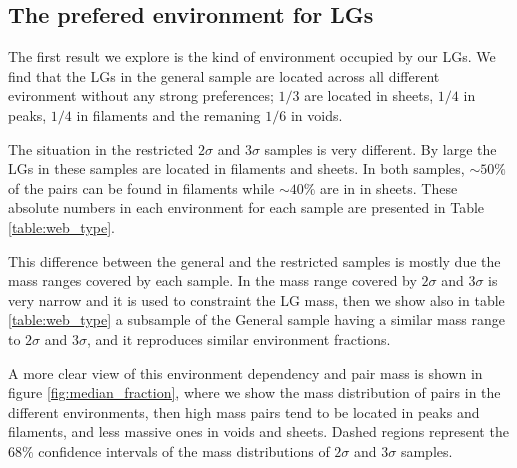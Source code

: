 \documentclass{emulateapj}
\begin{document}




\subsection{The prefered environment for LGs}

The first result we explore is the kind of environment occupied by
our LGs. We find that the LGs in the general sample are located across
all different evironment without any strong preferences; $1/3$  are
located in sheets, $1/4$ in peaks, $1/4$ in filaments and the remaning
$1/6$ in voids. 

The situation in the restricted $2\sigma$ and $3\sigma$ samples is very
different. By large the LGs in these samples are located in
filaments and sheets. In both samples, $\sim 50\%$ of the
pairs can be found in filaments while $\sim 40\%$ are in
in sheets. These absolute numbers in each environment for each sample
are presented in Table \ref{table:web_type}. 

This difference between the general and the restricted samples is mostly due 
the mass ranges covered by each sample. 
In \citet{lganalogues} the mass range covered by $2\sigma$ and $3\sigma$ 
is very narrow and it is used to constraint the LG mass, then we show 
also in table \ref{table:web_type} a subsample of the General sample
having a similar mass range to $2\sigma$ and $3\sigma$, and it reproduces 
similar environment fractions.

A more clear view of this environment dependency and pair mass is shown in
figure \ref{fig:median_fraction}, where we show the mass distribution of pairs
in the different environments, then high mass pairs tend to be located in 
peaks and filaments, and less massive ones in voids and sheets.
Dashed regions represent the $68\%$ confidence intervals of the mass 
distributions of $2\sigma$ and $3\sigma$ samples.
\end{document}

